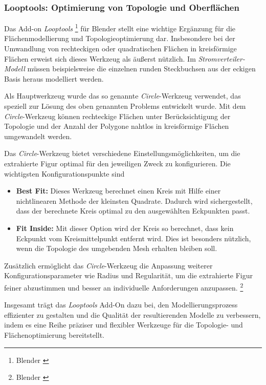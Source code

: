 \subsubsection{Looptools: Optimierung von Topologie und Oberflächen}
Das Add-on \textit{Looptools} \footnote{Blender \cite{LoopTools}} für Blender stellt eine wichtige Ergänzung für die Flächenmodellierung und Topologieoptimierung dar.  Insbesondere bei der Umwandlung von rechteckigen oder quadratischen Flächen in kreisförmige Flächen erweist sich dieses Werkzeug als äußerst nützlich. Im \textit{Stromverteiler-Modell} müssen beispielsweise die einzelnen runden Steckbuchsen aus der eckigen Basis heraus modelliert werden.

Als Hauptwerkzeug wurde das so genannte \textit{Circle}-Werkzeug verwendet, das speziell zur Lösung des oben genannten Problems entwickelt wurde. Mit dem \textit{Circle}-Werkzeug können rechteckige Flächen unter Berücksichtigung der Topologie und der Anzahl der Polygone nahtlos in kreisförmige Flächen umgewandelt werden.

Das \textit{Circle}-Werkzeug bietet verschiedene Einstellungsmöglichkeiten, um die extrahierte Figur optimal für den jeweiligen Zweck zu konfigurieren. Die wichtigsten Konfigurationspunkte sind

\begin{itemize}
    \item \textbf{Best Fit:} Dieses Werkzeug berechnet einen Kreis mit Hilfe einer nichtlinearen Methode der kleinsten Quadrate. Dadurch wird sichergestellt, dass der berechnete Kreis optimal zu den ausgewählten Eckpunkten passt.
    \item \textbf{Fit Inside:} Mit dieser Option wird der Kreis so berechnet, dass kein Eckpunkt vom Kreismittelpunkt entfernt wird. Dies ist besonders nützlich, wenn die Topologie des umgebenden Mesh erhalten bleiben soll.
\end{itemize}

Zusätzlich ermöglicht das \textit{Circle}-Werkzeug die Anpassung weiterer Konfigurationsparameter wie Radius und Regularität, um die extrahierte Figur feiner abzustimmen und besser an individuelle Anforderungen anzupassen. \footnote{Blender \cite{Circle-Werkzeug}}

Insgesamt trägt das \textit{Looptools} Add-On dazu bei, den Modellierungsprozess effizienter zu gestalten und die Qualität der resultierenden Modelle zu verbessern, indem es eine Reihe präziser und flexibler Werkzeuge für die Topologie- und Flächenoptimierung bereitstellt.

